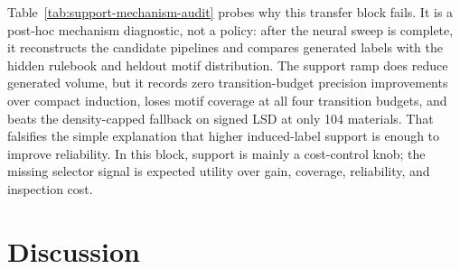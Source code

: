 \documentclass[11pt]{article}
\begin{document}
Table~\ref{tab:support-mechanism-audit} probes why this transfer block fails.
It is a post-hoc mechanism diagnostic, not a policy: after the neural sweep is
complete, it reconstructs the candidate pipelines and compares generated labels
with the hidden rulebook and heldout motif distribution. The support ramp does
reduce generated volume, but it records zero transition-budget precision
improvements over compact induction, loses motif coverage at all four
transition budgets, and beats the density-capped fallback on signed LSD at only
104 materials. That falsifies the simple explanation that higher induced-label
support is enough to improve reliability. In this block, support is mainly a
cost-control knob; the missing selector signal is expected utility over gain,
coverage, reliability, and inspection cost.

\section{Discussion}
\end{document}

